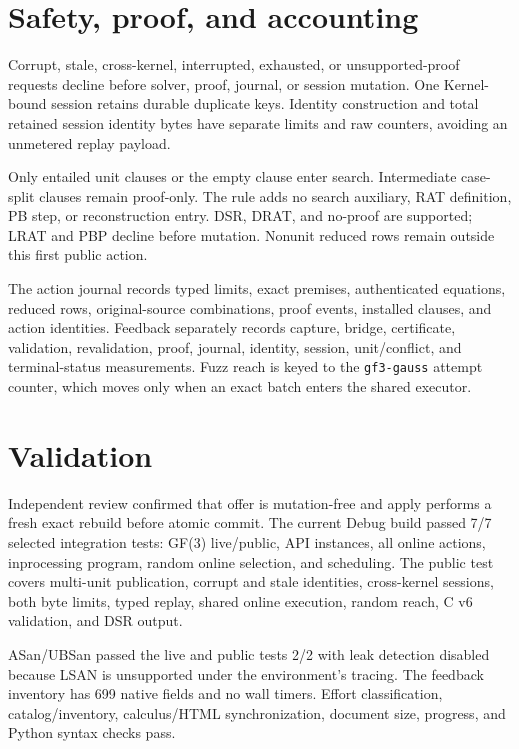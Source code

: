\documentclass[11pt]{article}
\newcommand{\code}[1]{\texttt{#1}}
\begin{document}
\section*{Safety, proof, and accounting}

Corrupt, stale, cross-kernel, interrupted, exhausted, or unsupported-proof
requests decline before solver, proof, journal, or session mutation. One
Kernel-bound session retains durable duplicate keys. Identity construction and
total retained session identity bytes have separate limits and raw counters,
avoiding an unmetered replay payload.

Only entailed unit clauses or the empty clause enter search. Intermediate
case-split clauses remain proof-only. The rule adds no search auxiliary, RAT
definition, PB step, or reconstruction entry. DSR, DRAT, and no-proof are
supported; LRAT and PBP decline before mutation. Nonunit reduced rows remain
outside this first public action.

The action journal records typed limits, exact premises, authenticated
equations, reduced rows, original-source combinations, proof events, installed
clauses, and action identities. Feedback separately records capture, bridge,
certificate, validation, revalidation, proof, journal, identity, session,
unit/conflict, and terminal-status measurements. Fuzz reach is keyed to the
\code{gf3-gauss} attempt counter, which moves only when an exact batch enters
the shared executor.

\section*{Validation}

Independent review confirmed that offer is mutation-free and apply performs a
fresh exact rebuild before atomic commit. The current Debug build passed 7/7
selected integration tests: GF(3) live/public, API instances, all online
actions, inprocessing program, random online selection, and scheduling. The
public test covers multi-unit publication, corrupt and stale identities,
cross-kernel sessions, both byte limits, typed replay, shared online execution,
random reach, C v6 validation, and DSR output.

ASan/UBSan passed the live and public tests 2/2 with leak detection disabled
because LSAN is unsupported under the environment's tracing. The feedback
inventory has 699 native fields and no wall timers. Effort classification,
catalog/inventory, calculus/HTML synchronization, document size, progress, and
Python syntax checks pass.
\end{document}
